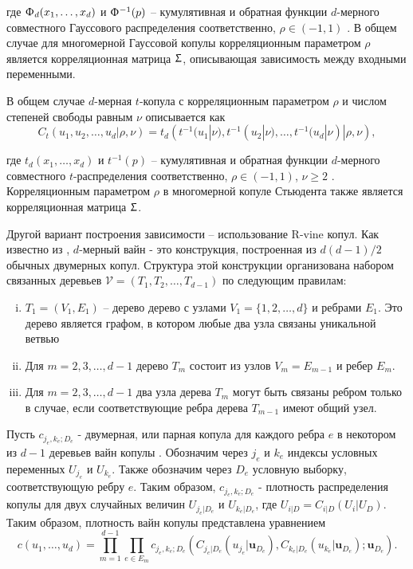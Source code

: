 \noindent где $\Upphi_d(x_1,\dots,x_d)$ и $\Upphi^{-1}(p)$ -- кумулятивная и обратная функции $d$-мерного совместного Гауссового распределения соответственно, $\rho \in (-1, 1)$ \cite{Emb2001}. 
В общем случае для многомерной Гауссовой копулы корреляционным параметром $\rho$ является корреляционная матрица $\Upsigma$, описывающая зависимость между входными переменными.

В общем случае $d$-мерная $t$-копула с корреляционным параметром $\rho$ и числом степеней свободы равным $\nu$ описывается как
%
\begin{equation} \label{tCop}
C_{t}(u_1,u_2,\ldots,u_d|\rho, \nu) = t_d \left( t^{-1} (u_1|\nu), t^{-1} (u_2|\nu), \ldots, t^{-1} (u_d|\nu) | \rho, \nu \right),
\end{equation}

\noindent где $t_d(x_1,\dots,x_d)$ и $t^{-1}(p)$ -- кумулятивная и обратная функции $d$-мерного совместного $t$-распределения соответственно, $\rho \in (-1, 1)$, $\nu \ge 2$ \cite{Emb2001}. 
Корреляционным параметром $\rho$ в многомерной копуле Стьюдента также является корреляционная матрица $\Upsigma$.

Другой вариант построения зависимости -- использование R-vine копул. Как известно из \cite{Bedfort2002}, $d$-мерный вайн - это конструкция, построенная из $d(d - 1)/2$ обычных двумерных копул. Структура этой конструкции организована набором связанных деревьев $\mathcal{V} = (T_1, T_2, \ldots, T_ {d-1})$ по следующим правилам:

\begin{enumerate}[(i)]
\item $T_1 = (V_1,E_1)$ -- дерево дерево с узлами $V_1 = \{1, 2, \ldots, d\}$ и ребрами $E_1$. 
Это дерево является графом, в котором любые два узла связаны уникальной ветвью \cite{Diestel2005}

\item Для $m = 2,3,\ldots,d - 1$ дерево $T_m$ состоит из узлов $V_m = E_{m-1}$ и ребер $E_m$.

\item \label{iii} Для $m = 2,3,\ldots,d - 1$ два узла дерева $T_m$ могут быть связаны ребром только в случае, если соответствующие ребра дерева $T_{m-1}$ имеют общий узел.
\end{enumerate}

Пусть $c_{j_e,k_e;D_e}$ - двумерная, или парная копула для каждого ребра $e$ в некотором из $d - 1$ деревьев вайн копулы \cite{Czado2010}. Обозначим через $j_e$ и $k_e$ индексы условных переменных $U_{j_e}$ и $U_{k_e}$. Также обозначим через $D_e$ условную выборку, соответствующую ребру $e$. Таким образом, $c_{j_e,k_e;D_e}$ - плотность распределения копулы для двух случайных величин $U_{j_e|D_e}$ и $U_{k_e|D_e}$, где $U_{i|D} = C_{i|D} (U_i|U_D)$. Таким образом, плотность вайн копулы представлена уравнением
%
\begin{equation}
    c(u_1, \ldots, u_d) = \prod_{m=1}^{d-1} \prod_{e \in E_m} c_{j_e,k_e;D_e} \left( C_{j_e|D_e} (u_{j_e}|\textbf{u}_{D_e}), C_{k_e|D_e} (u_{k_e}|\textbf{u}_{D_e}); \textbf{u}_{D_e} \right).
\end{equation}

